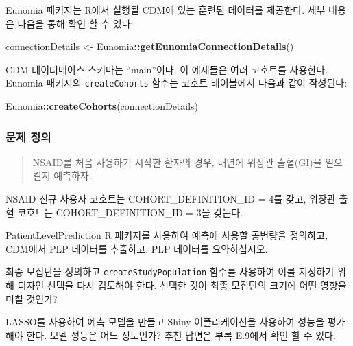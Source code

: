 \documentclass[11pt]{book}
\newenvironment{Shaded}{\begin{snugshade}}{\end{snugshade}}
\newcommand{\KeywordTok}[1]{\textcolor[rgb]{0.13,0.29,0.53}{\textbf{#1}}}
\newcommand{\StringTok}[1]{\textcolor[rgb]{0.31,0.60,0.02}{#1}}
\newcommand{\OperatorTok}[1]{\textcolor[rgb]{0.81,0.36,0.00}{\textbf{#1}}}
\newcommand{\NormalTok}[1]{#1}
\theoremstyle{definition}
\theoremstyle{definition}
\theoremstyle{definition}
\theoremstyle{remark}
\let\BeginKnitrBlock\begin \let\EndKnitrBlock\end
\begin{document}
Eunomia 패키지는 R에서 실행될 CDM에 있는 훈련된 데이터를 제공한다. 세부
내용은 다음을 통해 확인 할 수 있다:

\begin{Shaded}
\begin{Highlighting}[]
\NormalTok{connectionDetails <-}\StringTok{ }\NormalTok{Eunomia}\OperatorTok{::}\KeywordTok{getEunomiaConnectionDetails}\NormalTok{()}
\end{Highlighting}
\end{Shaded}

CDM 데이터베이스 스키마는 ``main''이다. 이 예제들은 여러 코호트를
사용한다. Eunomia 패키지의 \texttt{createCohorts} 함수는 코호트
테이블에서 다음과 같이 작성된다:

\begin{Shaded}
\begin{Highlighting}[]
\NormalTok{Eunomia}\OperatorTok{::}\KeywordTok{createCohorts}\NormalTok{(connectionDetails)}
\end{Highlighting}
\end{Shaded}

\subsubsection*{문제 정의}\label{--4}

\begin{quote}
NSAID를 처음 사용하기 시작한 환자의 경우, 내년에 위장관 출혈(GI)을
일으킬지 예측하자.
\end{quote}

NSAID 신규 사용자 코호트는 COHORT\_DEFINITION\_ID = 4를 갖고, 위장관
출혈 코호트는 COHORT\_DEFINITION\_ID = 3을 갖는다.

\BeginKnitrBlock{exercise}
\protect\hypertarget{exr:exercisePlp1}{}{\label{exr:exercisePlp1}
}PatientLevelPrediction R 패키지를 사용하여 예측에 사용할 공변량을
정의하고, CDM에서 PLP 데이터를 추출하고, PLP 데이터를 요약하십시오.
\EndKnitrBlock{exercise}

\BeginKnitrBlock{exercise}
\protect\hypertarget{exr:exercisePlp2}{}{\label{exr:exercisePlp2} }최종
모집단을 정의하고 \texttt{createStudyPopulation} 함수를 사용하여 이를
지정하기 위해 디자인 선택을 다시 검토해야 한다. 선택한 것이 최종
모집단의 크기에 어떤 영향을 미칠 것인가?
\EndKnitrBlock{exercise}

\BeginKnitrBlock{exercise}
\protect\hypertarget{exr:exercisePlp3}{}{\label{exr:exercisePlp3} }LASSO를
사용하여 예측 모델을 만들고 Shiny 어플리케이션을 사용하여 성능을
평가해야 한다. 모델 성능은 어느 정도인가? 추천 답변은 부록 E.9에서 확인
할 수 있다.
\EndKnitrBlock{exercise}
\end{document}
